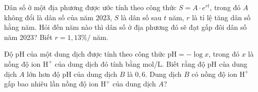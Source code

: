 \begin{bt}%

	Dân số ở một địa phương được ước tính theo công thức $S=A\cdot e^{rt}$, trong đó $A$ không đổi là dân số của năm 2023, $S$ là dân số sau $t$ năm, $r$ là tỉ lệ tăng dân số hằng năm. Hỏi đến năm nào thì dân số ở địa phương đó sẽ đạt gấp đôi dân số năm 2023? Biết $r=1{,}13\% /$ năm.
\end{bt}

\begin{bt}%
	Độ pH của một dung dịch được tính theo công thức $\mathrm{pH}=-\log x$,  trong đó $x$ 
	là nồng độ ion $\mathrm{H}^+$ của dung dịch đó tính bằng mol/L. Biết rằng độ pH của dung dịch $A$ lớn hơn độ
	pH của dung dịch $B$ là $0{,}6$. Dung dịch $B$ có nồng độ ion $\mathrm{H}^+$ gấp bao nhiêu lần nồng độ ion $\mathrm{H}^+$ của 
	dung dịch $A$?
\end{bt}

